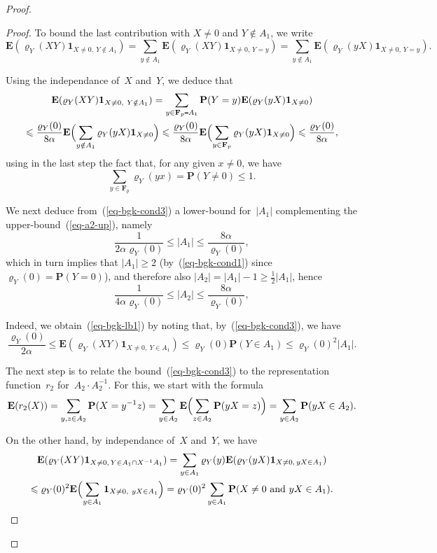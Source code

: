 \documentclass[12pt]{amsart}
\renewcommand{\leq}{\leqslant}
\renewcommand{\geq}{\geqslant}
\numberwithin{equation}{section}
\def\setminus{\mathchoice
    {\mathbin{\vrule height .62ex width 1.61ex depth -.38ex}}%
    {\mathbin{\vrule height .62ex width 1.61ex depth -.38ex}}%
    {\mathbin{\vrule height .50ex width 0.85ex depth -.28ex}}%
    {\mathbin{\vrule height .20ex width 0.570ex depth -.24ex}}%
}
\newcommand{\Ff}{\mathbf{F}}
\newcommand{\proba}{\mathbf{P}}
\newcommand{\expect}{\mathbf{E}}
\newcommand{\charfun}{\mathbf{1}}
\renewcommand{\rho}{\varrho}
\newcommand{\demi}{{\textstyle{\frac{1}{2}}}}
\theoremstyle{plain}
\theoremstyle{remark}
\theoremstyle{definition}
\renewcommand{\geq}{\geqslant}
\renewcommand{\leq}{\leqslant}
\begin{document}
\begin{proof}
\begin{proof}
    To bound the last contribution with $X\not=0$ and $Y\notin A_1$, we
    write
    $$
    \expect(\rho_Y(XY)\charfun_{X\not=0,\ Y\notin A_1}) =\sum_{y\notin
      A_1} \expect(\rho_Y(XY)\charfun_{X\not=0,\, Y=y})= \sum_{y\notin
      A_1} \expect(\rho_Y(yX)\charfun_{X\not=0,\, Y=y}).
    $$
    
    Using the independance of~$X$ and~$Y$, we deduce that
    \begin{multline*}
      \expect(\rho_Y(XY)\charfun_{X\not=0,\ Y\notin A_1}) =\sum_{y\in
        \Ff_p\setminus A_1}\proba(Y=y)\expect(\rho_Y(yX)\charfun_{X\not=0})
      \\
      \leq \frac{\rho_Y(0)}{8\alpha}\expect\Bigl(\sum_{y\notin
        A_1}\rho_Y(yX)\charfun_{X\not=0} \Bigr) \leq \frac{\rho_Y(0)}{8\alpha}
      \expect\Bigl(\sum_{y\in\Ff_p}\rho_Y(yX)\charfun_{X\not=0}\Bigr) \leq
      \frac{\rho_Y(0)}{8\alpha},
    \end{multline*}
    using in the last step the fact that, for any given $x\not=0$, we
    have
    $$
    \sum_{y\in\Ff_p}\rho_Y(yx)=\proba(Y\not=0)\leq 1.
    $$
    
    We next deduce from~(\ref{eq-bgk-cond3}) a lower-bound for~$|A_1|$
    complementing the upper-bound~(\ref{eq-a2-up}), namely
    \begin{equation}\label{eq-bgk-lb1}
      \frac{1}{2\alpha \rho_Y(0)}\leq |A_1|\leq \frac{8\alpha}{\rho_Y(0)},
    \end{equation}
    which in turn implies that $|A_1|\geq 2$ (by~(\ref{eq-bgk-cond1})
    since $\rho_Y(0)=\proba(Y=0)$), and therefore also
    $|A_2|=|A_1|-1\geq \demi |A_1|$, hence
    $$
    \frac{1}{4\alpha \rho_Y(0)}\leq |A_2|\leq
    \frac{8\alpha}{\rho_Y(0)},
    $$
      
    Indeed, we obtain~(\ref{eq-bgk-lb1}) by noting that,
    by~(\ref{eq-bgk-cond3}), we have
    $$
    \frac{\rho_Y(0)}{2\alpha}\leq \expect(\rho_Y(XY)\charfun_{X\not=0,\
      Y\in A_1})\leq \rho_Y(0)\proba(Y\in A_1)\leq \rho_Y(0)^2|A_1|.
    $$
    
    The next step is to relate the bound~(\ref{eq-bgk-cond3}) to the
    representation function~$r_2$ for~$A_2\cdot A_2^{-1}$. For this, we
    start with the formula
    $$
    \expect(r_2(X))=\sum_{y,z\in A_2}\proba(X=y^{-1}z)=
    \sum_{y\in A_2}\expect\Bigl(\sum_{z\in A_2}\proba(yX=z)\Bigr)=
    \sum_{y\in A_2}\proba(yX\in A_2).
    $$
    
    On the other hand, by independance of~$X$ and~$Y$, we have
    \begin{multline*}
      \expect(\rho_Y(XY)\charfun_{X\not=0,\, Y\in A_1\cap X^{-1}A_1})
      =\sum_{y\in A_1}\rho_Y(y)\expect(\rho_Y(yX)\charfun_{X\not=0,\,
        yX\in A_1})
      \\
      \leq \rho_Y(0)^2 \expect\Bigl(\sum_{y\in A_1}\charfun_{X\not=0,\
        yX\in A_1}\Bigr)=\rho_Y(0)^2\sum_{y\in A_1}\proba(X\not=0\text{
        and } yX\in A_1).
    \end{multline*}
    

\end{proof}
\end{proof}
\end{document}
